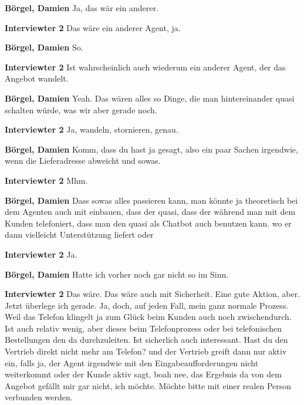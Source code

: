 \textbf{Börgel, Damien}\newline
Ja, das wär ein anderer.

\textbf{Interviewter 2}\newline
Das wäre ein anderer Agent, ja.

\textbf{Börgel, Damien}\newline
So.

\textbf{Interviewter 2}\newline
Ist wahrscheinlich auch wiederum ein anderer Agent, der das Angebot wandelt.

\textbf{Börgel, Damien}\newline
Yeah.
Das wären alles so Dinge, die man hintereinander quasi schalten würde, was wir aber gerade noch.

\textbf{Interviewter 2}\newline
Ja, wandeln, stornieren, genau.

\textbf{Börgel, Damien}\newline
Komm, dass du hast ja gesagt, also ein paar Sachen irgendwie, wenn die Lieferadresse abweicht und sowas.

\textbf{Interviewter 2}\newline
Mhm.

\textbf{Börgel, Damien}\newline
Dass sowas alles passieren kann, man könnte ja theoretisch bei dem Agenten auch mit einbauen, dass der quasi, dass der während man mit dem Kunden telefoniert, dass man den quasi als Chatbot auch benutzen kann. wo er dann vielleicht Unterstützung liefert oder

\textbf{Interviewter 2}\newline
Ja.

\textbf{Börgel, Damien}\newline
Hatte ich vorher noch gar nicht so im Sinn.

\textbf{Interviewter 2}\newline
Das wäre.
Das wäre auch mit Sicherheit.
Eine gute Aktion, aber.
Jetzt überlege ich gerade.
Ja, doch, auf jeden Fall, mein ganz normale Prozess.
Weil das Telefon klingelt ja zum Glück beim Kunden auch noch zwischendurch.
Ist auch relativ wenig, aber dieses beim Telefonprozess oder bei telefonischen Bestellungen den da durchzuleiten.
Ist sicherlich auch interessant. Hast du den Vertrieb direkt nicht mehr am Telefon?
und der Vertrieb greift dann nur aktiv ein, falls ja, der Agent irgendwie mit den Eingabeaufforderungen nicht weiterkommt oder der Kunde aktiv sagt, boah nee, das Ergebnis da von dem Angebot gefällt mir gar nicht, ich möchte.
Möchte bitte mit einer realen Person verbunden werden.

